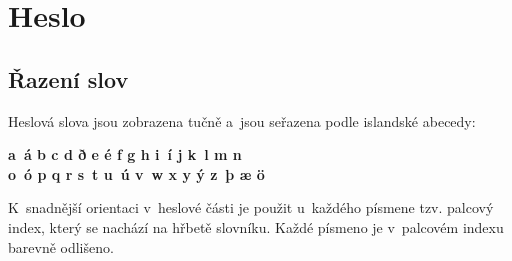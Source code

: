 \def\tableD{\noindent\begin{tabularx}{\columnwidth}{>{\bfseries}lllll}
  \toprule
  \textit{zkratka} & \textit{slovo} & \textit{pád} & \textit{číslo}
    & \specialcell{\textit{předmět}\\\textit{podmět}} \\
  \midrule
  e-að  & eitthvað   & 1. & sg & neživotný \\
  e-ð   & eitthvað   & 4. & sg & neživotný \\
  e-ir  & einhverjir & 1. & pl & životný \\
  e-ja  & einhverja  & 4. & pl & životný \\
  e-jum & einhverjum & 3. & pl & životný \\
  e-m   & einhverjum & 3. & sg & životný \\
  e-n   & einhvern   & 4. & sg & životný \\
  e-r   & einhver    & 1. & sg & životný \\
  e-rra & einhverra  & 2. & pl & životný \\
  e-rs  & einhvers   & 2. & sg & životný \\
  e-s   & einhvers  & 2. & sg & neživotný \\
  e-u   & einhverju  & 3. & sg & neživotný \\
  \bottomrule
  \end{tabularx}
  \captionof{table}{Seznam použitých zkratek neurčitých zájmen}
  \label{table4}}


\section{Heslo}

\subsection*{Řazení slov}

Heslová slova jsou zobrazena tučně a~jsou seřazena podle islandské abecedy:

\blspace
{\bfseries\centering
  a~á b c d ð e é f g h i~í j k~l m n\\
  o~ó p q r s~t u~ú v~w x y ý z~þ æ ö\par}
\blspace

K~snadnější orientaci v~heslové části je použit u~každého písmene tzv. palcový index, který se nachází na hřbetě slovníku. Každé písmeno je v~palcovém indexu barevně odlišeno.

